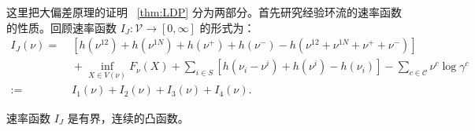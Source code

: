 这里把大偏差原理的证明 ~\ref{thm:LDP} 分为两部分。首先研究经验环流的速率函数的性质。回顾速率函数 $I_J:\mathcal{V}\to[0,\infty]$ 的形式为：
\begin{equation*}\label{ratefunction1}
	\begin{split}
		I_J(\nu) =&\; \left[h\left(\nu^{12}\right)+h\left(\nu^{1N}\right)
		+h\left(\nu^+\right)+h\left(\nu^-\right)-h\left(\nu^{12}+\nu^{1N}+\nu^++\nu^-\right)\right] \\
		&\;+\inf_{X\in V(\nu)}F_{\nu}(X)+\sum_{i\in S}\left[ h\left(\nu_i-\nu^i\right)+h\left(\nu^i\right)
		-h\left(\nu_i\right)\right]-\sum_{c\in\mathcal{C}}\nu^c\log\gamma^c\\
		:=&\;I_1(\nu)+I_2(\nu)+I_3(\nu)+I_4(\nu).
	\end{split}
\end{equation*}
\begin{proposition}\label{proposition:I}
	速率函数 $I_J$ 是有界，连续的凸函数。
\end{proposition}
